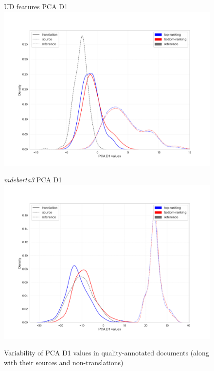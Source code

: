 \begin{figure}[H]
	\begin{minipage}[c]{0.5\linewidth}
		\centering
		UD features PCA D1
		\includegraphics[width=\linewidth]{figures/pca/src-qua-ttype-ud-PCA-D1-lines}
	\end{minipage}	
	\begin{minipage}[c]{0.5\linewidth}
		\centering
		\textit{mdeberta3} PCA D1
		\includegraphics[width=\linewidth]{figures/pca/src-qua-ttype-mdeberta3-base-PCA-D1-lines}
	\end{minipage}
	\caption{\label{fig:pca_qua}Variability of PCA D1 values in quality-annotated documents (along with their sources and non-translations)}	
\end{figure}   


